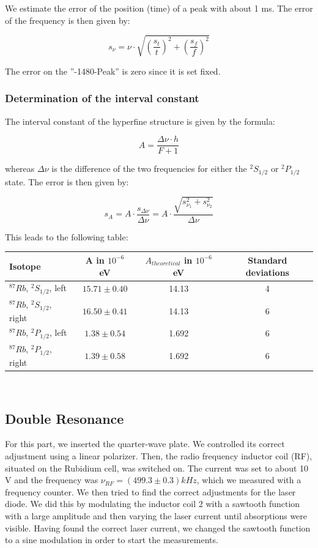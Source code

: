 We estimate the error of the position (time) of a peak with about 1 ms. The error of the frequency is then given by:

$$s_\nu = \nu\cdot\sqrt{\left(\frac{s_t}{t}\right)^2 + \left(\frac{s_f}{f}\right)^2}$$

The error on the ''-1480-Peak'' is zero since it is set fixed.

\subsubsection{Determination of the interval constant}

The interval constant of the hyperfine structure is given by the formula:

$$ A = \frac{\Delta\nu\cdot h}{F+1} $$

whereas $\Delta\nu$ is the difference of the two frequencies for either the $^2S_{1/2}$ or $^2P_{1/2}$ state. The error is then given by:

$$ s_A = A\cdot\frac{s_{\Delta\nu}}{\Delta\nu} = A\cdot\frac{\sqrt{s_{\nu_1}^2 + s_{\nu_2}^2}}{\Delta\nu} $$

This leads to the following table:

\begin{center}
\begin{tabular}[H]{l | c c c}
Isotope & A in $10^{-6}$ eV & $A_{theoretical}$ in $10^{-6}$ eV & Standard deviations\\ \hline
$^{87}Rb$, $^2S_{1/2}$, left & $ 15.71 \pm 0.40 $ & 14.13 	& 4 	\\ %
$^{87}Rb$, $^2S_{1/2}$, right & $ 16.50 \pm 0.41 $ & 14.13 	& 6	\\ %
$^{87}Rb$, $^2P_{1/2}$, left & $1.38 \pm 0.54 $ & 1.692 		& 6	\\ %
$^{87}Rb$, $^2P_{1/2}$, right & $ 1.39 \pm 0.58 $ & 1.692 	& 6	\\ %
\end{tabular}\\
\end{center}


\clearpage
\subsection{Double Resonance}

For this part, we inserted the quarter-wave plate. We controlled its correct adjustment using a linear polarizer. Then, the radio frequency inductor coil (RF), situated on the Rubidium cell, was switched on. The current was set to about 10 V and the frequency was $\nu_{RF} = (499.3 \pm 0.3) kHz$, which we measured with a frequency counter. We then tried to find the correct adjustments for the laser diode. We did this by modulating the inductor coil 2 with a sawtooth function with a large amplitude and then varying the laser current until absorptions were visible. Having found the correct laser current, we changed the sawtooth function to a sine modulation in order to start the measurements.

